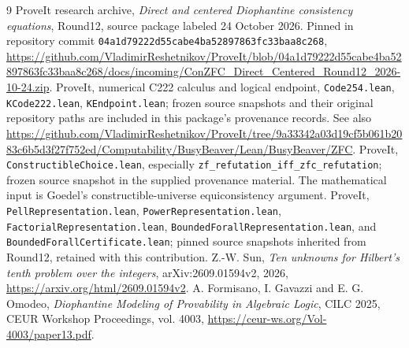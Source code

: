 \documentclass[11pt,a4paper]{article}
\theoremstyle{definition}\newtheorem{definition}[theorem]{Definition}
\theoremstyle{remark}\newtheorem{remark}[theorem]{Remark}
\numberwithin{equation}{section}
\begin{document}
\begin{thebibliography}{9}
 ProveIt research archive,
\emph{Direct and centered Diophantine consistency equations}, Round12,
source package labeled 24 October 2026. Pinned in repository commit
\texttt{04a1d79222d55cabe4ba52897863fc33baa8c268},
\url{https://github.com/VladimirReshetnikov/ProveIt/blob/04a1d79222d55cabe4ba52897863fc33baa8c268/docs/incoming/ConZFC_Direct_Centered_Round12_2026-10-24.zip}.
 ProveIt, numerical C222 calculus and logical endpoint,
\texttt{Code254.lean}, \texttt{KCode222.lean}, \texttt{KEndpoint.lean};
frozen source snapshots and their original repository paths are included
in this package's provenance records. See also
\url{https://github.com/VladimirReshetnikov/ProveIt/tree/9a33342a03d19cf5b061b2083c6b5d3f27f752ed/Computability/BusyBeaver/Lean/BusyBeaver/ZFC}.
 ProveIt, \texttt{ConstructibleChoice.lean}, especially
\texttt{zf\_refutation\_iff\_zfc\_refutation}; frozen source snapshot in
the supplied provenance material. The mathematical input is Goedel's
constructible-universe equiconsistency argument.
 ProveIt, \texttt{PellRepresentation.lean},
\texttt{PowerRepresentation.lean}, \texttt{FactorialRepresentation.lean},
\texttt{BoundedForallRepresentation.lean}, and
\texttt{BoundedForallCertificate.lean}; pinned source snapshots inherited
from Round12, retained with this contribution.
 Z.-W. Sun, \emph{Ten unknowns for Hilbert's tenth problem
over the integers}, arXiv:2609.01594v2, 2026,
\url{https://arxiv.org/html/2609.01594v2}.
 A. Formisano, I. Gavazzi and E. G. Omodeo,
\emph{Diophantine Modeling of Provability in Algebraic Logic},
CILC 2025, CEUR Workshop Proceedings, vol. 4003,
\url{https://ceur-ws.org/Vol-4003/paper13.pdf}.
\end{thebibliography}
\end{document}
